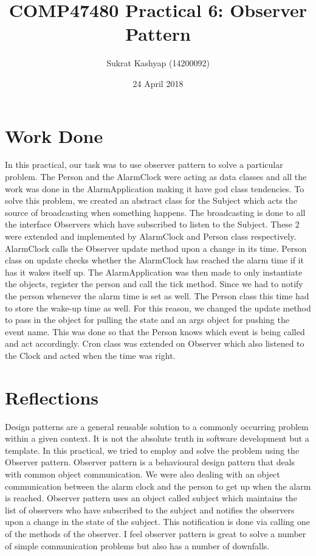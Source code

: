 \documentclass[12pt]{article}
\title{\vspace{-3.0cm}COMP47480 Practical 6: Observer Pattern}
\author{Sukrat Kashyap (14200092)}
\date{24 April 2018}
\begin{document}
\maketitle

\section{Work Done}

In this practical, our task was to use observer pattern to solve a particular problem. The Person and the AlarmClock were acting as data classes and all the work was done in the AlarmApplication making it have god class tendencies. To solve this problem, we created an abstract class for the Subject which acts the source of broadcasting when something happens. The broadcasting is done to all the interface Observers which have subscribed to listen to the Subject. These 2 were extended and implemented by AlarmClock and Person class respectively. AlarmClock calls the Observer update method upon a change in its time. Person class on update checks whether the AlarmClock has reached the alarm time if it has it wakes itself up. The AlarmApplication was then made to only instantiate the objects, register the person and call the tick method. Since we had to notify the person whenever the alarm time is set as well. The Person class this time had to store the wake-up time as well. For this reason, we changed the update method to pass in the object for pulling the state and an args object for pushing the event name. This was done so that the Person knows which event is being called and act accordingly. Cron class was extended on Observer which also listened to the Clock and acted when the time was right.

\section{Reflections}

Design patterns are a general reusable solution to a commonly occurring problem within a given context. It is not the absolute truth in software development but a template. In this practical, we tried to employ and solve the problem using the Observer pattern. Observer pattern is a behavioural design pattern that deals with common object communication. We were also dealing with an object communication between the alarm clock and the person to get up when the alarm is reached. Observer pattern uses an object called subject which maintains the list of observers who have subscribed to the subject and notifies the observers upon a change in the state of the subject. This notification is done via calling one of the methods of the observer. I feel observer pattern is great to solve a number of simple communication problems but also has a number of downfalls.
\end{document}
